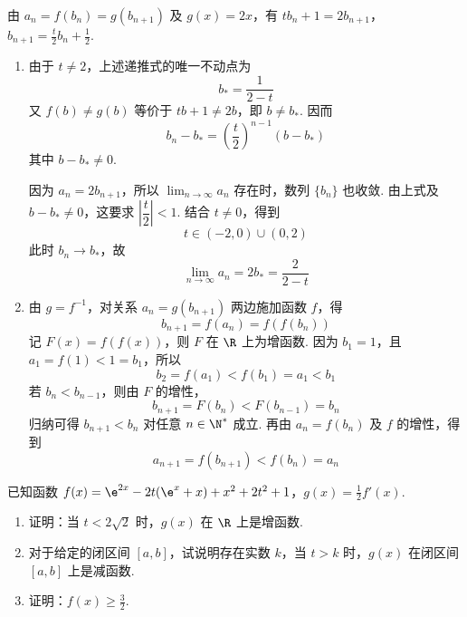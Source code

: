 \begin{solution}
由 \(a_n=f(b_n)=g(b_{n+1})\) 及 \(g(x)=2x\)，有
\(tb_n+1=2b_{n+1}\)，\(b_{n+1}=\frac{t}{2}b_n+\frac{1}{2}\).

\begin{enumerate}
\item 由于 \(t\ne2\)，上述递推式的唯一不动点为
\[
b_{*}=\frac{1}{2-t}
\]
又 \(f(b)\ne g(b)\) 等价于 \(tb+1\ne2b\)，即 \(b\ne b_{*}\). 因而
\[
b_n-b_{*}=\left(\frac{t}{2}\right)^{n-1}(b-b_{*})
\]
其中 \(b-b_{*}\ne0\).

因为 \(a_n=2b_{n+1}\)，所以 \(\displaystyle\lim_{n\to\infty}a_n\) 存在时，数列 \(\{b_n\}\) 也收敛. 由上式及 \(b-b_{*}\ne0\)，这要求 \(\left|\dfrac{t}{2}\right|<1\). 结合 \(t\ne0\)，得到
\[
t\in(-2,0)\cup(0,2)
\]
此时 \(b_n\to b_{*}\)，故
\[
\displaystyle\lim_{n\to\infty}a_n=2b_{*}=\frac{2}{2-t}
\]
\item 由 \(g=f^{-1}\)，对关系 \(a_n=g(b_{n+1})\) 两边施加函数 \(f\)，得
\[
b_{n+1}=f(a_n)=f(f(b_n))
\]
记 \(F(x)=f(f(x))\)，则 \(F\) 在 \(\R\) 上为增函数. 因为 \(b_1=1\)，且 \(a_1=f(1)<1=b_1\)，所以
\[
b_2=f(a_1)<f(b_1)=a_1<b_1
\]
若 \(b_n<b_{n-1}\)，则由 \(F\) 的增性，
\[
b_{n+1}=F(b_n)<F(b_{n-1})=b_n
\]
归纳可得 \(b_{n+1}<b_n\) 对任意 \(n\in\N^{*}\) 成立. 再由 \(a_n=f(b_n)\) 及 \(f\) 的增性，得到
\[
a_{n+1}=f(b_{n+1})<f(b_n)=a_n
\]
\end{enumerate}
\end{solution}

\begin{problem}
已知函数 \(f(x) = \e^{2x} - 2t(\e^{x} + x) + x^{2} + 2t^{2} + 1\)，\(g(x) = \frac{1}{2} f'(x)\).

\begin{enumerate}
\item 证明：当 \(t < 2\sqrt{2}\) 时，\(g(x)\) 在 \(\R\) 上是增函数.
\item 对于给定的闭区间 \([a, b]\)，试说明存在实数 \(k\)，当 \(t > k\) 时，\(g(x)\) 在闭区间 \([a, b]\) 上是减函数.
\item 证明：\(f(x) \geqslant \frac{3}{2}\).
\end{enumerate}
\end{problem}

